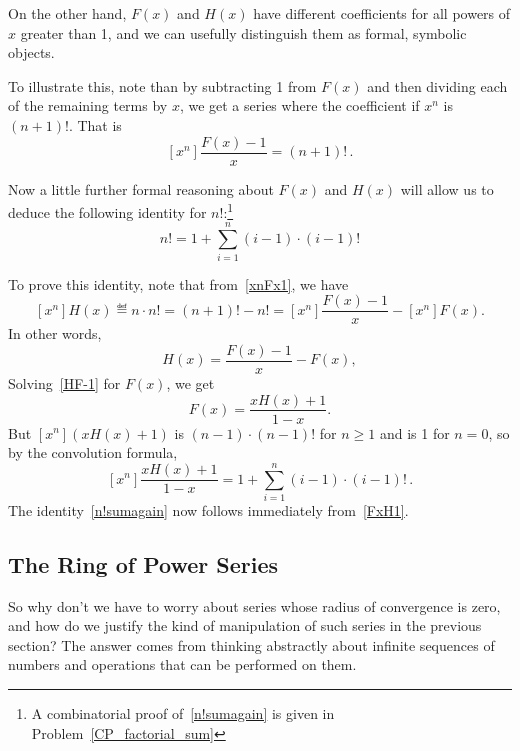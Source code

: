 On the other hand, $F(x)$ and $H(x)$ have different coefficients for
  all powers of $x$ greater than 1, and we can usefully distinguish
  them as formal, symbolic objects.

To illustrate this, note than by subtracting 1 from $F(x)$ and then
dividing each of the remaining terms by $x$, we get a series where the
coefficient if $x^n$ is $(n+1)!$.  That is
\begin{equation}\label{xnFx1}
[x^n]\frac{F(x) - 1}{x} = (n+1)!\, .
\end{equation}

Now a little further formal reasoning about $F(x)$ and $H(x)$ will
allow us to deduce the following identity for $n!$:\footnote{A
combinatorial proof of~\eqref{n!sumagain} is given in
Problem~\ref{CP_factorial_sum}}
\begin{equation}\label{n!sumagain}
n! = 1 + \sum_{i=1}^{n} (i-1) \cdot (i-1)!
\end{equation}

To prove this identity, note that from~\eqref{xnFx1}, we have
\[
[x^n]H(x) \eqdef n \cdot n! = (n+1)! - n! = [x^n]\frac{F(x) - 1}{x} - [x^n]F(x).
\]
In other words,
\begin{equation}\label{HF-1}
H(x) = \frac{F(x) - 1}{x} - F(x),
\end{equation}
Solving~\eqref{HF-1} for $F(x)$, we get
\begin{equation}\label{FxH1}
F(x) = \frac{xH(x)+1}{1-x}.
\end{equation}
But $[x^n](xH(x)+1)$ is $(n-1) \cdot (n-1)!$ for $n \geq 1$ and is 1
for $n=0$, so by the convolution formula,
\[
[x^n]\frac{xH(x)+1}{1-x} = 1 + \sum_{i=1}^{n} (i-1) \cdot (i-1)! \, .
\]
The identity~\eqref{n!sumagain} now follows immediately
from~\eqref{FxH1}.

\subsection{The Ring of Power Series}
So why don't we have to worry about series whose radius of convergence
is zero, and how do we justify the kind of manipulation of such series
in the previous section?  The answer comes from thinking abstractly
about infinite sequences of numbers and operations that can be
performed on them.

